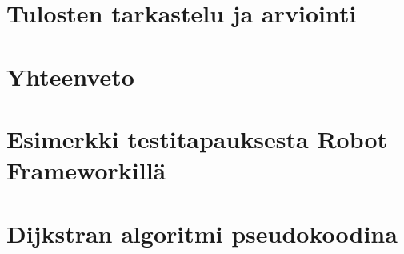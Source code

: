 \documentclass[finnish, authoryear]{config/tauthesis}
\theoremstyle{definition}
\begin{document}
\chapter{Tulosten tarkastelu ja arviointi} \label{ch:11_tulosten_tarkastelu_ja_arviointi}
  
\chapter{Yhteenveto} \label{ch:12_yhteenveto}
  
\printbibliography[heading=bibintoc]

\begin{appendices}
\chapter{Esimerkki testitapauksesta Robot Frameworkillä} \label{ch:13_liite_robot_testitapaus}
  
\chapter{Dijkstran algoritmi pseudokoodina} \label{ch:14_liite_dijkstran_algoritmi}
  
\end{appendices}
\end{document}
